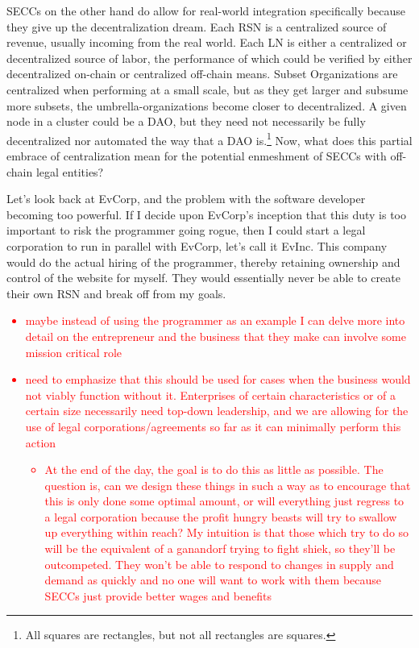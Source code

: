 \documentclass{article}[10pt]
\begin{document}
SECCs on the other hand do allow for real-world integration specifically because they give up the decentralization dream.
Each RSN is a centralized source of revenue, usually incoming from the real world.
Each LN is either a centralized or decentralized source of labor, the performance of which could be verified by either decentralized on-chain or centralized off-chain means.
Subset Organizations are centralized when performing at a small scale, but as they get larger and subsume more subsets, the umbrella-organizations become closer to decentralized.
A given node in a cluster could be a DAO, but they need not necessarily be fully decentralized nor automated the way that a DAO is.\footnote{
    All squares are rectangles, but not all rectangles are squares.}
Now, what does this partial embrace of centralization mean for the potential enmeshment of SECCs with off-chain legal entities?\par

Let's look back at EvCorp, and the problem with the software developer becoming too powerful.
If I decide upon EvCorp's inception that this duty is too important to risk the programmer going rogue, then I could start a legal corporation to run in parallel with EvCorp, let's call it EvInc.
This company would do the actual hiring of the programmer, thereby retaining ownership and control of the website for myself.
They would essentially never be able to create their own RSN and break off from my goals.\par
\textcolor{red}{\begin{itemize}
    \item maybe instead of using the programmer as an example I can delve more into detail on the entrepreneur and the business that they make can involve some mission critical role
    \item need to emphasize that this should be used for cases when the business would not viably function without it.
    Enterprises of certain characteristics or of a certain size necessarily need top-down leadership, and we are allowing for the use of legal corporations/agreements so far as it can minimally perform this action
    \begin{itemize}
        \item At the end of the day, the goal is to do this as little as possible.
        The question is, can we design these things in such a way as to encourage that this is only done some optimal amount, or will everything just regress to a legal corporation because the profit hungry beasts will try to swallow up everything within reach?
        My intuition is that those which try to do so will be the equivalent of a ganandorf trying to fight shiek, so they'll be outcompeted.
        They won't be able to respond to changes in supply and demand as quickly and no one will want to work with them because SECCs just provide better wages and benefits
    \end{itemize}
\end{itemize}}
\end{document}
